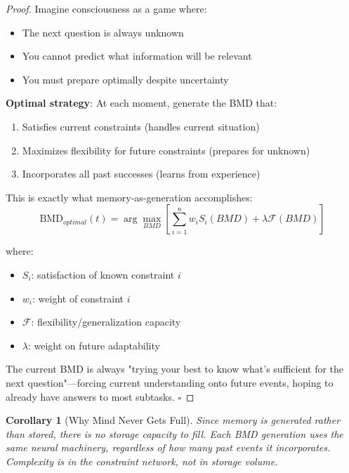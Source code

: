 \documentclass[11pt,a4paper]{article}
\newtheorem{corollary}[theorem]{Corollary}
\begin{document}
\begin{proof}
Imagine consciousness as a game where:
\begin{itemize}
\item The next question is always unknown
\item You cannot predict what information will be relevant
\item You must prepare optimally despite uncertainty
\end{itemize}

\textbf{Optimal strategy}: At each moment, generate the BMD that:
\begin{enumerate}
\item Satisfies current constraints (handles current situation)
\item Maximizes flexibility for future constraints (prepares for unknown)
\item Incorporates all past successes (learns from experience)
\end{enumerate}

This is exactly what memory-as-generation accomplishes:
\begin{equation}
\text{BMD}_{optimal}(t) = \arg\max_{BMD} \left[ \sum_{i=1}^{n} w_i S_i(BMD) + \lambda \mathcal{F}(BMD) \right]
\end{equation}

where:
\begin{itemize}
\item $S_i$: satisfaction of known constraint $i$
\item $w_i$: weight of constraint $i$
\item $\mathcal{F}$: flexibility/generalization capacity
\item $\lambda$: weight on future adaptability
\end{itemize}

The current BMD is always "trying your best to know what's sufficient for the next question"—forcing current understanding onto future events, hoping to already have answers to most subtasks. $\square$
\end{proof}

\begin{corollary}[Why Mind Never Gets Full]
Since memory is generated rather than stored, there is no storage capacity to fill. Each BMD generation uses the same neural machinery, regardless of how many past events it incorporates. Complexity is in the constraint network, not in storage volume.
\end{corollary}
\end{document}
